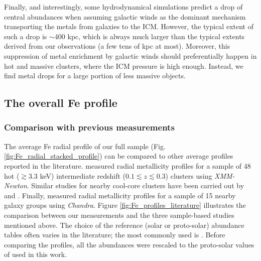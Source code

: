 \documentclass{aa}
\begin{document}
Finally, and interestingly, some hydrodynamical simulations \citep{2005A&A...435L..25S,2009A&A...504..719K} predict a drop of central abundances when assuming galactic winds as the dominant mechanism transporting the metals from galaxies to the ICM. However, the typical extent of such a drop is $\sim$400 kpc, which is always much larger than the typical extents derived from our observations (a few tens of kpc at most). Moreover, this suppression of metal enrichment by galactic winds should preferentially happen in hot and massive clusters, where the ICM pressure is high enough. Instead, we find metal drops for a large portion of less massive objects.



















\subsection{The overall Fe profile}\label{sect:discussion_Fe}


\subsubsection{Comparison with previous measurements}\label{sect:Fe_literature}



The average Fe radial profile of our full sample (Fig. \ref{fig:Fe_radial_stacked_profile}) can be compared to other average profiles reported in the literature. \citet{2008A&A...487..461L} measured radial metallicity profiles for a sample of 48 hot ($\gtrsim$3.3 keV) intermediate redshift ($0.1 \lesssim z \lesssim 0.3$) clusters using \textit{XMM-Newton}. Similar studies for nearby cool-core clusters have been carried out by \citet[][\textit{Chandra}, $z < 0.1$]{2009MNRAS.395..764S} and \citet[][\textit{XMM-Newton}, $z < 0.08$]{2011A&A...527A.134M}. Finally, \citet{2007MNRAS.380.1554R} measured radial metallicity profiles for a sample of 15 nearby galaxy groups using \textit{Chandra}. 
Figure \ref{fig:Fe_profiles_literature} illustrates the comparison between our measurements and the three sample-based studies mentioned above. The choice of the reference (solar or proto-solar) abundance tables often varies in the literature; the most commonly used is \citet{1989GeCoA..53..197A}. Before comparing the profiles, all the abundances were rescaled to the proto-solar values of \citet{2009LanB...4B...44L} used in this work.
\end{document}
